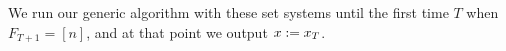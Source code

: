 We run our generic algorithm with these set systems until the first time $T$ when $F_{T+1} = [n]$, and at that point we output $x := x_T$.











